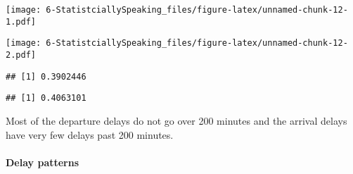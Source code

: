 \documentclass[
]{article}
\newenvironment{Shaded}{\begin{snugshade}}{\end{snugshade}}
\newcommand{\AttributeTok}[1]{\textcolor[rgb]{0.13,0.29,0.53}{#1}}
\newcommand{\CommentTok}[1]{\textcolor[rgb]{0.56,0.35,0.01}{\textit{#1}}}
\newcommand{\ConstantTok}[1]{\textcolor[rgb]{0.56,0.35,0.01}{#1}}
\newcommand{\DecValTok}[1]{\textcolor[rgb]{0.00,0.00,0.81}{#1}}
\newcommand{\FunctionTok}[1]{\textcolor[rgb]{0.13,0.29,0.53}{\textbf{#1}}}
\newcommand{\NormalTok}[1]{#1}
\newcommand{\SpecialCharTok}[1]{\textcolor[rgb]{0.81,0.36,0.00}{\textbf{#1}}}
\newcommand{\StringTok}[1]{\textcolor[rgb]{0.31,0.60,0.02}{#1}}
\begin{document}
\texttt{[image: 6-StatistciallySpeaking\_files/figure-latex/unnamed-chunk-12-1.pdf]}

\begin{Shaded}
\end{Shaded}

\texttt{[image: 6-StatistciallySpeaking\_files/figure-latex/unnamed-chunk-12-2.pdf]}

\begin{Shaded}
\end{Shaded}

\begin{verbatim}
## [1] 0.3902446
\end{verbatim}

\begin{Shaded}
\end{Shaded}

\begin{verbatim}
## [1] 0.4063101
\end{verbatim}

Most of the departure delays do not go over 200 minutes and the arrival
delays have very few delays past 200 minutes.

\paragraph{Delay patterns}\label{delay-patterns}
\end{document}
